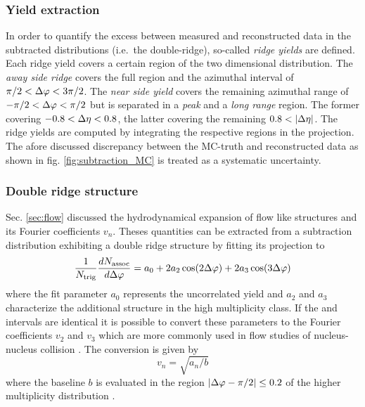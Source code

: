 \subsubsection{Yield extraction}
\label{sec:yield_extraction}

In order to quantify the excess between measured and reconstructed data in the subtracted distributions (i.e.\ the double-ridge), so-called \emph{ridge yields} are defined. Each ridge yield covers a certain region of the two dimensional distribution. The \emph{away side ridge} covers the full \deta region and the azimuthal interval of $\pi / 2 < \Delta\varphi < 3\pi /2$. The \emph{near side yield} covers the remaining azimuthal range of $-\pi / 2 < \Delta\varphi < \pi /2$ but is separated in a \emph{peak} and a \emph{long range} region. The former covering $-0.8 < \Delta\eta < 0.8$, the latter covering the remaining $0.8 < |\Delta\eta |$. The ridge yields are computed by integrating the respective regions in the \dphi projection. The afore discussed discrepancy between the MC-truth and reconstructed data as shown in fig. \ref{fig:subtraction_MC} is treated as a systematic uncertainty.

\subsubsection{Double ridge structure}
\label{sec:double_ridge}

Sec. \ref{sec:flow} discussed the hydrodynamical expansion of flow like structures and its Fourier coefficients $ v_n$. Theses quantities can be extracted from a subtraction distribution exhibiting a double ridge structure by fitting its \dphi projection to
\begin{equation}
  \label{eq:double_cosin_fit}
  \frac{1}{N_{\text{trig}}}\frac{dN_{\text{assoc}}}{d\Delta\varphi} =
  a_0 + 2a_2 \cos (2\Delta\varphi )+ 2a_3 \cos (3\Delta\varphi )
\end{equation}
where the fit parameter $a_0$ represents the uncorrelated yield and $a_2$ and $a_3$ characterize the additional structure in the high multiplicity class. If the \ptassoc and \pttrig intervals are identical it is possible to convert these parameters to the Fourier coefficients $v_2$ and $v_3$ which are more commonly used in flow studies of nucleus-nucleus collision \cite{Voloshin1994}. The conversion is given by
\begin{equation}
  \label{eq:v_n}
  v_n = \sqrt{a_n / b}
\end{equation}
where the baseline $b$ is evaluated in the region $|\Delta\varphi - \pi /2 | \le 0.2$ of the higher multiplicity distribution \cite{Abelev2012}.


